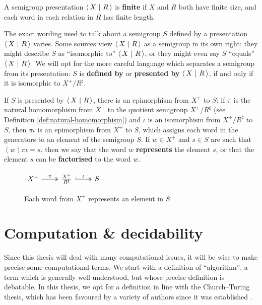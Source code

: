 \begin{definition}
  \label{def:finite-presentation}
  A semigroup presentation $\left\langle\,X ~\middle|~ R\,\right\rangle$ is \textbf{finite} if $X$ and $R$ both
  have finite size, and each word in each relation in $R$ has finite length.
\end{definition}

The exact wording used to talk about a semigroup $S$ defined by a presentation
$\left\langle\,X ~\middle|~ R\,\right\rangle$ varies.  Some sources view $\left\langle\,X ~\middle|~ R\,\right\rangle$ as a semigroup in its own
right: they might describe $S$ as ``isomorphic to'' $\left\langle\,X ~\middle|~ R\,\right\rangle$, or they might
even say $S$ ``equals'' $\left\langle\,X ~\middle|~ R\,\right\rangle$.  We will opt for the more careful language
which separates a semigroup from its presentation: $S$ is \textbf{defined by} or
\textbf{presented by} $\left\langle\,X ~\middle|~ R\,\right\rangle$, if and only if it is isomorphic to
$X^+ / R^\sharp$.

If $S$ is presented by $\left\langle\,X ~\middle|~ R\,\right\rangle$, there is an epimorphism from $X^+$ to $S$:
if $\pi$ is the natural homomorphism from $X^+$ to the quotient semigroup
$X^+ / R^\sharp$ (see Definition \ref{def:natural-homomorphism}) and $\iota$ is
an isomorphism from $X^+ / R^\sharp$ to $S$, then $\pi\iota$ is an epimorphism
from $X^+$ to $S$, which assigns each word in the generators to an element of
the semigroup $S$.  If $w \in X^+$ and $s \in S$ are such that
$(w)\pi\iota = s$, then we say that the word $w$ \textbf{represents} the element
$s$, or that the element $s$ can be \textbf{factorised} to the word $w$.

\begin{figure}[h]
  \centering
  $
  \begin{tikzcd}
    X^+ \ar[r, two heads, "\pi"] &
    \frac{X^+}{R^\sharp} \ar[r, two heads, hook, "\iota"] &
    S
  \end{tikzcd}
  $
  \caption{Each word from $X^+$ represents an element in $S$}
  \label{fig:word-represents-element}
\end{figure}

\section{Computation \& decidability}
\label{sec:computation-decidability}

Since this thesis will deal with many computational issues, it will be wise to
make precise some computational terms.  We start with a definition of
``algorithm'', a term which is generally well understood, but whose precise
definition is debatable.  In this thesis, we opt for a definition in line with
the Church--Turing thesis, which has been favoured by a variety of authors since
it was established \cite{gurevich_2000, minsky_1967}.

